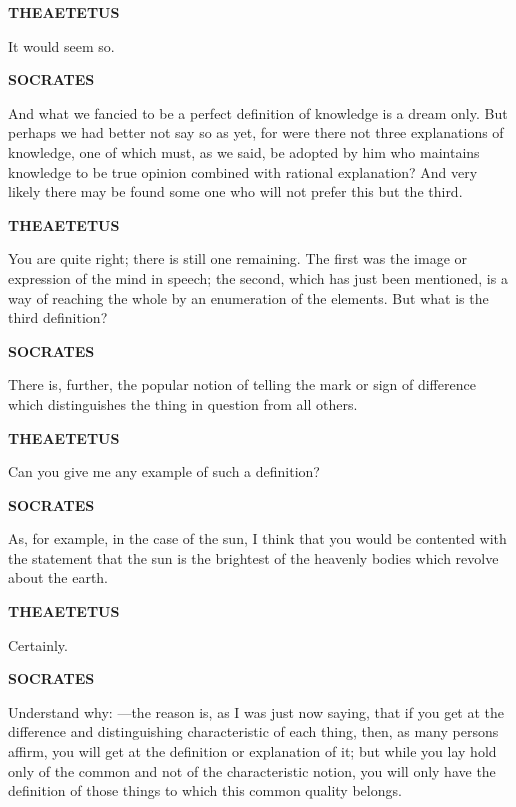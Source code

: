 \documentclass[11pt,letter]{article}
\begin{document}
\par \textbf{THEAETETUS}
\par   It would seem so.

\par \textbf{SOCRATES}
\par   And what we fancied to be a perfect definition of knowledge is a dream only. But perhaps we had better not say so as yet, for were there not three explanations of knowledge, one of which must, as we said, be adopted by him who maintains knowledge to be true opinion combined with rational explanation? And very likely there may be found some one who will not prefer this but the third.

\par \textbf{THEAETETUS}
\par   You are quite right; there is still one remaining. The first was the image or expression of the mind in speech; the second, which has just been mentioned, is a way of reaching the whole by an enumeration of the elements. But what is the third definition?

\par \textbf{SOCRATES}
\par   There is, further, the popular notion of telling the mark or sign of difference which distinguishes the thing in question from all others.

\par \textbf{THEAETETUS}
\par   Can you give me any example of such a definition?

\par \textbf{SOCRATES}
\par   As, for example, in the case of the sun, I think that you would be contented with the statement that the sun is the brightest of the heavenly bodies which revolve about the earth.

\par \textbf{THEAETETUS}
\par   Certainly.

\par \textbf{SOCRATES}
\par   Understand why: —the reason is, as I was just now saying, that if you get at the difference and distinguishing characteristic of each thing, then, as many persons affirm, you will get at the definition or explanation of it; but while you lay hold only of the common and not of the characteristic notion, you will only have the definition of those things to which this common quality belongs.
\end{document}
